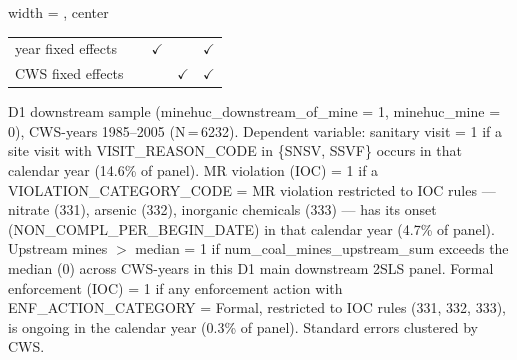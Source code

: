 \begin{table}[htbp]
\begin{adjustbox}{width = \textwidth, center}
\begin{tabular}{lcccc}
          \\
         
         year fixed effects        &                & $\checkmark$  &               & $\checkmark$\\   
         CWS fixed effects         &                &               & $\checkmark$  & $\checkmark$\\   
         
         \bottomrule
         
      \end{tabular}
      
      
      
   \end{adjustbox}
      {\tiny\linespread{1}\selectfont \par \raggedright 
   D1 downstream sample (minehuc\_downstream\_of\_mine = 1, minehuc\_mine = 0), CWS-years 1985--2005 (N\,=\,6232). Dependent variable: sanitary visit = 1 if a site visit with VISIT\_REASON\_CODE in \{SNSV, SSVF\} occurs in that calendar year (14.6\% of panel). MR violation (IOC) = 1 if a VIOLATION\_CATEGORY\_CODE = MR violation restricted to IOC rules — nitrate (331), arsenic (332), inorganic chemicals (333) — has its onset (NON\_COMPL\_PER\_BEGIN\_DATE) in that calendar year (4.7\% of panel). Upstream mines $>$ median = 1 if num\_coal\_mines\_upstream\_sum exceeds the median (0) across CWS-years in this D1 main downstream 2SLS panel. Formal enforcement (IOC) = 1 if any enforcement action with ENF\_ACTION\_CATEGORY = Formal, restricted to IOC rules (331, 332, 333), is ongoing in the calendar year (0.3\% of panel). Standard errors clustered by CWS.}
   
\end{table}


